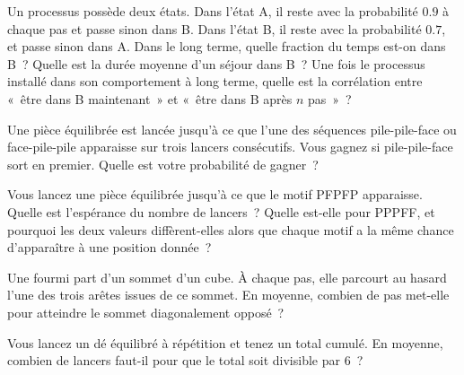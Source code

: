 \begin{question}\label{iq:iv1:waiting-times-and-markov-chains:5}
Un processus possède deux états. Dans l'état A, il reste avec la probabilité $0.9$ à chaque pas et passe sinon dans B. Dans l'état B, il reste avec
la probabilité $0.7$, et passe sinon dans A. Dans le long terme, quelle fraction du temps est-on dans B~? Quelle est la durée moyenne d'un séjour dans B~?
Une fois le processus installé dans son comportement à long terme, quelle est la corrélation entre «~être dans B maintenant~» et «~être dans B après $n$ pas~»~?
\end{question}

\begin{question}\label{iq:iv1:waiting-times-and-markov-chains:6}
Une pièce équilibrée est lancée jusqu'à ce que l'une des séquences pile-pile-face ou face-pile-pile apparaisse sur trois lancers consécutifs. Vous gagnez si pile-pile-face sort
en premier. Quelle est votre probabilité de gagner~?
\end{question}

\begin{question}\label{iq:iv1:waiting-times-and-markov-chains:7}
Vous lancez une pièce équilibrée jusqu'à ce que le motif PFPFP apparaisse. Quelle est l'espérance du nombre de lancers~? Quelle est-elle pour PPPFF, et pourquoi les deux valeurs diffèrent-elles alors que chaque motif a la même chance d'apparaître à une position donnée~?
\end{question}

\begin{question}\label{iq:iv1:waiting-times-and-markov-chains:8}
Une fourmi part d'un sommet d'un cube. À chaque pas, elle parcourt au hasard l'une des trois arêtes issues de ce sommet. En moyenne, combien de
pas met-elle pour atteindre le sommet diagonalement opposé~?
\end{question}

\begin{question}\label{iq:iv1:waiting-times-and-markov-chains:9}
Vous lancez un dé équilibré à répétition et tenez un total cumulé. En moyenne, combien de lancers faut-il pour que le total soit divisible par 6~?
\end{question}

